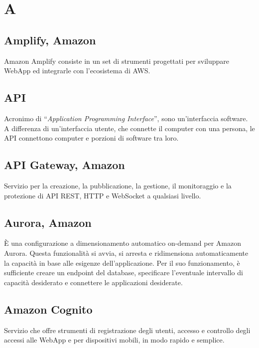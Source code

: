 \section{A}

\subsection{Amplify, Amazon}
Amazon Amplify consiste in un set di strumenti progettati per sviluppare WebApp ed integrarle con l'ecosistema di AWS. 

\subsection{API}
Acronimo di “\textit{Application Programming Interface}”, sono un’interfaccia software. A differenza di un’interfaccia utente, che connette il computer con una persona, le API connettono computer e porzioni di software tra loro.

\subsection{API Gateway, Amazon}
Servizio per la creazione, la pubblicazione, la gestione, il monitoraggio e la protezione di API REST, HTTP e WebSocket a qualsiasi livello.

\subsection{Aurora, Amazon}
È una configurazione a dimensionamento automatico on-demand per Amazon Aurora. Questa funzionalità si avvia, si arresta e ridimensiona automaticamente la capacità in base alle esigenze dell'applicazione. Per il suo funzionamento, è sufficiente creare un endpoint del database, specificare l'eventuale intervallo di capacità desiderato e connettere le applicazioni desiderate.  

\subsection{Amazon Cognito}
Servizio che offre strumenti di registrazione degli utenti, accesso e controllo degli accessi alle WebApp e per dispositivi mobili, in modo rapido e semplice.


